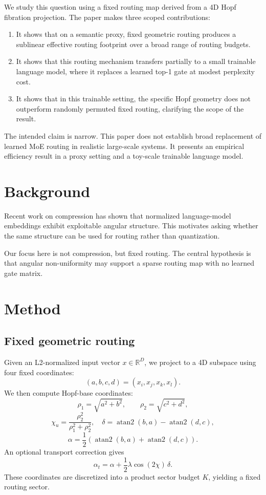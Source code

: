 \documentclass[10pt,twocolumn]{article}
\begin{document}
We study this question using a fixed routing map derived from a 4D Hopf fibration projection. The paper makes three scoped contributions:
\begin{enumerate}
    \item It shows that on a semantic proxy, fixed geometric routing produces a sublinear effective routing footprint over a broad range of routing budgets.
    \item It shows that this routing mechanism transfers partially to a small trainable language model, where it replaces a learned top-1 gate at modest perplexity cost.
    \item It shows that in this trainable setting, the specific Hopf geometry does not outperform randomly permuted fixed routing, clarifying the scope of the result.
\end{enumerate}

The intended claim is narrow. This paper does not establish broad replacement of learned MoE routing in realistic large-scale systems. It presents an empirical efficiency result in a proxy setting and a toy-scale trainable language model.

\section{Background}
Recent work on compression has shown that normalized language-model embeddings exhibit exploitable angular structure. This motivates asking whether the same structure can be used for routing rather than quantization.

Our focus here is not compression, but fixed routing. The central hypothesis is that angular non-uniformity may support a sparse routing map with no learned gate matrix.

\section{Method}
\subsection{Fixed geometric routing}
Given an L2-normalized input vector $x \in \mathbb{R}^D$, we project to a 4D subspace using four fixed coordinates:
\[
(a,b,c,d) = (x_i, x_j, x_k, x_l).
\]
We then compute Hopf-base coordinates:
\[
\rho_1 = \sqrt{a^2+b^2}, \qquad \rho_2 = \sqrt{c^2+d^2},
\]
\[
\chi_u = \frac{\rho_2^2}{\rho_1^2+\rho_2^2}, \quad
\delta = \operatorname{atan2}(b,a) - \operatorname{atan2}(d,c),
\]
\[
\alpha = \frac{1}{2}\left(\operatorname{atan2}(b,a)+\operatorname{atan2}(d,c)\right).
\]
An optional transport correction gives
\[
\alpha_t = \alpha + \frac{1}{2}\lambda \cos(2\chi)\,\delta.
\]
These coordinates are discretized into a product sector budget $K$, yielding a fixed routing sector.
\end{document}
